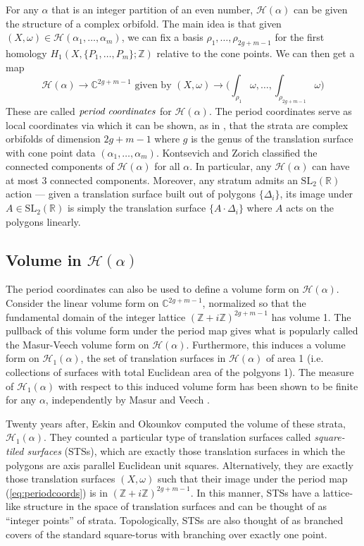 \documentclass[12pt]{amsart}
\numberwithin{equation}{section}
\numberwithin{theorem}{section}
\newcommand{\RR}{\mathbb{R}}
\newcommand{\calH}{\mathcal{H}}
\newcommand{\ZZ}{\mathbb{Z}}
\newcommand{\CC}{\mathbb{C}}
\newcommand{\SL}{\mathrm{SL}}
\begin{document}
For any $\alpha$ that is an integer partition of an even number, $\calH(\alpha)$ can be given the structure of a complex orbifold. The main idea is that given $(X, \omega) \in \calH(\alpha_1, \dots, \alpha_m)$, we can fix a basis $\rho_1, \dots, \rho_{2g+m-1}$ for the first homology $H_1(X, \{P_1, \dots, P_m\};\ZZ)$ relative to the cone points. We can then get a map
\begin{equation}\label{eq:periodcoords}
 \calH(\alpha) \rightarrow \CC^{2g+m-1} 
 \text{ given by } (X, \omega) \rightarrow  \bigg(\int_{\rho_1} \omega, \dots, \int_{\rho_{2g+m-1}} \omega\bigg)
\end{equation}
These are called $\emph{period coordinates}$ for $\calH(\alpha)$. The period coordinates serve as local coordinates via which it can be shown, as in \cite{Masur, Veech1, Veech2}, that the strata are complex orbifolds of dimension $2g+m-1$
where $g$ is the genus of the translation surface with cone point data $(\alpha_1, \dots, \alpha_m)$. Kontsevich and Zorich \cite{KontZor} classified the connected components of $\calH(\alpha)$ for all $\alpha$. In particular, any $\calH(\alpha)$ can have at most 3 connected components. Moreover, any stratum admits an $\SL_2(\RR)$ action --- given a translation surface built out of polygons $\{\Delta_i\}$, its image under $A \in \SL_2(\RR)$ is simply the translation surface $\{A \cdot \Delta_i\}$ where $A$ acts on the polygons linearly.


\subsection{Volume in $\calH(\alpha)$}

The period coordinates can also be used to define a volume form on $\calH(\alpha)$. Consider the linear volume form on $\CC^{2g+m-1}$, normalized so that the fundamental domain of the integer lattice $(\ZZ+i\ZZ)^{2g+m-1}$ has volume 1. The pullback of this volume form under the period map gives what is popularly called the Masur-Veech volume form on $\calH(\alpha)$. Furthermore, this induces a volume form on $\calH_1(\alpha)$, the set of translation surfaces in $\calH(\alpha)$ of area 1 (i.e. collections of surfaces with total Euclidean area of the polgyons 1). The measure of $\calH_1(\alpha)$ with respect to this induced volume form has been shown to be finite for any $\alpha$, independently by Masur \cite{Masur} and Veech \cite{Veech1}.

Twenty years after, Eskin and Okounkov \cite{EskOk} computed the volume of these strata, $\calH_1(\alpha)$. They counted a particular type of translation surfaces called \emph{square-tiled surfaces} (STSs), which are exactly those translation surfaces in which the polygons are axis parallel Euclidean unit squares. Alternatively, they are exactly those translation surfaces $(X , \omega)$ such that their image under the period map (\ref{eq:periodcoords}) is in $(\ZZ + i \ZZ)^{2g+m-1}$. In this manner, STSs have a lattice-like structure in the space of translation surfaces and can be thought of as ``integer points'' of strata. Topologically, STSs are also thought of as branched covers of the standard square-torus with branching over exactly one point. 
\end{document}
